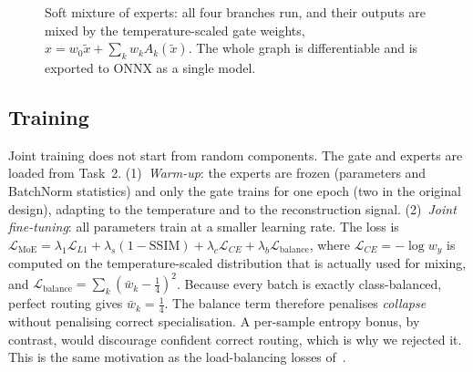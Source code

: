 ﻿\documentclass[conference]{IEEEtran}
\begin{document}
\begin{figure}[t]\centering
{}
\caption{Soft mixture of experts: all four branches run, and their outputs are mixed by the
temperature-scaled gate weights, $\hat x=w_0\tilde x+\sum_k w_kA_k(\tilde x)$. The whole graph is
differentiable and is exported to ONNX as a single model.}
\label{fig:moe}
\end{figure}

\subsection{Training}
Joint training does not start from random components. The gate and experts are loaded from Task~2.
(1)~\emph{Warm-up}: the experts are frozen (parameters and BatchNorm statistics) and only the gate
trains for one epoch (two in the original design), adapting to the temperature and to the reconstruction signal. (2)~\emph{Joint
fine-tuning}: all parameters train at a smaller learning rate. The loss is
$\mathcal{L}_{\text{MoE}}=\lambda_1\mathcal{L}_{L1}+\lambda_s(1-\text{SSIM})+\lambda_c\mathcal{L}_{CE}+\lambda_b\mathcal{L}_{\text{balance}}$,
where $\mathcal{L}_{CE}=-\log w_y$ is computed on the temperature-scaled distribution that is actually
used for mixing, and $\mathcal{L}_{\text{balance}}=\sum_k(\bar w_k-\frac14)^2$. Because every batch is
exactly class-balanced, perfect routing gives $\bar w_k=\frac14$. The balance term therefore penalises
\emph{collapse} without penalising correct specialisation. A per-sample entropy bonus, by contrast,
would discourage confident correct routing, which is why we rejected it. This is the same motivation as
the load-balancing losses of~\cite{shazeer2017moe,fedus2022switch}.
\end{document}
